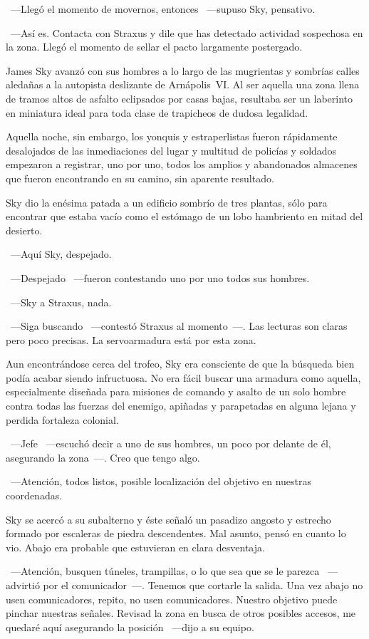 ~---Llegó el momento de movernos, entonces ~---supuso Sky, pensativo.

~---Así es. Contacta con Straxus y dile que has detectado actividad sospechosa en la zona. Llegó el momento de sellar el pacto largamente postergado.

\bigskip\noindent
James Sky avanzó con sus hombres a lo largo de las mugrientas y sombrías calles aledañas a la autopista deslizante de Arnápolis~VI. Al ser aquella una zona llena de tramos altos de asfalto eclipsados por casas bajas, resultaba ser un laberinto en miniatura ideal para toda clase de trapicheos de dudosa legalidad.

Aquella noche, sin embargo, los yonquis y estraperlistas fueron rápidamente desalojados de las inmediaciones del lugar y multitud de policías y soldados empezaron a registrar, uno por uno, todos los amplios y abandonados almacenes que fueron encontrando en su camino, sin aparente resultado.

Sky dio la enésima patada a un edificio sombrío de tres plantas, sólo para encontrar que estaba vacío como el estómago de un lobo hambriento en mitad del desierto.

~---Aquí Sky, despejado.

~---Despejado ~---fueron contestando uno por uno todos sus hombres.

~---Sky a Straxus, nada.

~---Siga buscando ~---contestó Straxus al momento~---. Las lecturas son claras pero poco precisas. La servoarmadura está por esta zona.

Aun encontrándose cerca del trofeo, Sky era consciente de que la búsqueda bien podía acabar siendo infructuosa. No era fácil buscar una armadura como aquella, especialmente diseñada para misiones de comando y asalto de un solo hombre contra todas las fuerzas del enemigo, apiñadas y parapetadas en alguna lejana y perdida fortaleza colonial.

~---Jefe ~---escuchó decir a uno de sus hombres, un poco por delante de él, asegurando la zona~---. Creo que tengo algo.

~---Atención, todos listos, posible localización del objetivo en nuestras coordenadas.

Sky se acercó a su subalterno y éste señaló un pasadizo angosto y estrecho formado por escaleras de piedra descendentes. Mal asunto, pensó en cuanto lo vio. Abajo era probable que estuvieran en clara desventaja.

~---Atención, busquen túneles, trampillas, o lo que sea que se le parezca ~---advirtió por el comunicador~---. Tenemos que cortarle la salida. Una vez abajo no usen comunicadores, repito, no usen comunicadores. Nuestro objetivo puede pinchar nuestras señales. Revisad la zona en busca de otros posibles accesos, me quedaré aquí asegurando la posición ~---dijo a su equipo.

